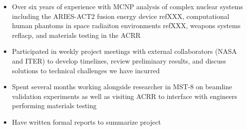 \documentclass[a4paper,10pt]{article}
\begin{document}
\begin{itemize}[leftmargin=.9in,rightmargin=.875in,itemsep=1.6mm]

\item Over six years of experience with MCNP analysis of complex nuclear
	systems including the ARIES-ACT2 fusion energy device refXXX,
		computational human phantoms in space radiaiton environments
		refXXX, weapons systems reflacp, and materials testing in the
		ACRR
\item Participated in weekly project meetings with external collaborators (NASA and
	ITER) to develop timelines, review preliminary results, and discuss
		solutions to technical challenges we have incurred
		\item Spent several months working alongside researcher in
			MST-8 on beamline validation experiments as well as
			visiting ACRR to interface with engineers performing
			materials testing
		\item Have written formal reports to summarize project

\end{itemize}
\end{document}
